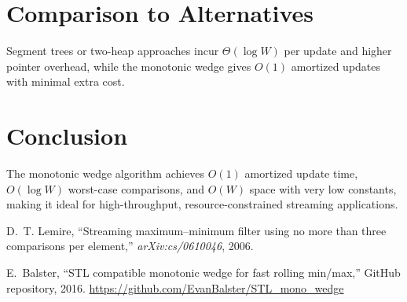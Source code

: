 \documentclass[11pt,letterpaper]{article}
\begin{document}
\section{Comparison to Alternatives}
Segment trees or two-heap approaches incur \(\Theta(\log W)\) per update and higher pointer overhead, while the monotonic wedge gives \(O(1)\) amortized updates with minimal extra cost.

\section{Conclusion}
The monotonic wedge algorithm achieves \(O(1)\) amortized update time, \(O(\log W)\) worst-case comparisons, and \(O(W)\) space with very low constants, making it ideal for high-throughput, resource-constrained streaming applications.

\begin{thebibliography}{9}
D.~T. Lemire, “Streaming maximum–minimum filter using no more than three comparisons per element,” \emph{arXiv:cs/0610046}, 2006.

E.~Balster, “STL compatible monotonic wedge for fast rolling min/max,” GitHub repository, 2016. \url{https://github.com/EvanBalster/STL_mono_wedge}
\end{thebibliography}
\end{document}
